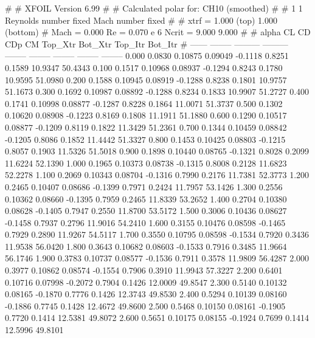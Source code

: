 #  
#       XFOIL         Version 6.99
#  
# Calculated polar for: CH10 (smoothed)                                 
#  
# 1 1 Reynolds number fixed          Mach number fixed         
#  
# xtrf =   1.000 (top)        1.000 (bottom)  
# Mach =   0.000     Re =     0.070 e 6     Ncrit =   9.000  9.000
#  
#   alpha    CL        CD       CDp       CM     Top_Xtr  Bot_Xtr  Top_Itr  Bot_Itr
#  ------ -------- --------- --------- -------- -------- -------- -------- --------
   0.000   0.0830   0.10875   0.09049  -0.1118   0.8251   0.1589  10.9347  50.4343
   0.100   0.1517   0.10968   0.08937  -0.1294   0.8243   0.1780  10.9595  51.0980
   0.200   0.1588   0.10945   0.08919  -0.1288   0.8238   0.1801  10.9757  51.1673
   0.300   0.1692   0.10987   0.08892  -0.1288   0.8234   0.1833  10.9907  51.2727
   0.400   0.1741   0.10998   0.08877  -0.1287   0.8228   0.1864  11.0071  51.3737
   0.500   0.1302   0.10620   0.08908  -0.1223   0.8169   0.1808  11.1911  51.1880
   0.600   0.1290   0.10517   0.08877  -0.1209   0.8119   0.1822  11.3429  51.2361
   0.700   0.1344   0.10459   0.08842  -0.1205   0.8086   0.1852  11.4442  51.3327
   0.800   0.1453   0.10425   0.08803  -0.1215   0.8057   0.1903  11.5326  51.5018
   0.900   0.1898   0.10440   0.08765  -0.1321   0.8028   0.2099  11.6224  52.1390
   1.000   0.1965   0.10373   0.08738  -0.1315   0.8008   0.2128  11.6823  52.2278
   1.100   0.2069   0.10343   0.08704  -0.1316   0.7990   0.2176  11.7381  52.3773
   1.200   0.2465   0.10407   0.08686  -0.1399   0.7971   0.2424  11.7957  53.1426
   1.300   0.2556   0.10362   0.08660  -0.1395   0.7959   0.2465  11.8339  53.2652
   1.400   0.2704   0.10380   0.08628  -0.1405   0.7947   0.2550  11.8700  53.5172
   1.500   0.3006   0.10436   0.08627  -0.1458   0.7937   0.2796  11.9016  54.2410
   1.600   0.3155   0.10476   0.08598  -0.1465   0.7929   0.2890  11.9267  54.5117
   1.700   0.3550   0.10795   0.08598  -0.1534   0.7920   0.3436  11.9538  56.0420
   1.800   0.3643   0.10682   0.08603  -0.1533   0.7916   0.3485  11.9664  56.1746
   1.900   0.3783   0.10737   0.08577  -0.1536   0.7911   0.3578  11.9809  56.4287
   2.000   0.3977   0.10862   0.08574  -0.1554   0.7906   0.3910  11.9943  57.3227
   2.200   0.6401   0.10716   0.07998  -0.2072   0.7904   0.1426  12.0009  49.8547
   2.300   0.5140   0.10132   0.08165  -0.1870   0.7776   0.1426  12.3743  49.8530
   2.400   0.5294   0.10139   0.08160  -0.1886   0.7745   0.1428  12.4672  49.8600
   2.500   0.5468   0.10150   0.08161  -0.1905   0.7720   0.1414  12.5381  49.8072
   2.600   0.5651   0.10175   0.08155  -0.1924   0.7699   0.1414  12.5996  49.8101
